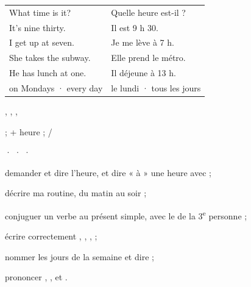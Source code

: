 \begin{essentiel}
\begin{minipage}[t]{0.52\linewidth}
\renewcommand{\arraystretch}{1.32}
\begin{tabular}{@{}>{\enOn\otSemi\fontsize{9.4}{11}\selectfont}l<{\enOff}@{\hspace{3mm}}>{\fontsize{9.2}{11}\selectfont\color{white!78!otNavy}}l@{}}
What time is it?            & Quelle heure est-il ?\\
It's nine thirty.           & Il est 9 h 30.\\
I get up at seven.          & Je me lève à 7 h.\\
She takes the subway.       & Elle prend le métro.\\
He has lunch at one.        & Il déjeune à 13 h.\\
on Mondays · every day      & le lundi · tous les jours\\
\end{tabular}
\end{minipage}\hfill
\begin{minipage}[t]{0.42\linewidth}
{\par}
{\fontsize{9.2}{11.6}\selectfont {}, , , \par}
{\fontsize{9.2}{11.6}\selectfont {} ;  + heure ;  / \par}
{\fontsize{9.2}{11.6}\selectfont {}  ·   ·   ·  \par}
\end{minipage}
\end{essentiel}

\begin{jesais}
\item demander et dire l'heure, et dire « à » une heure avec  ;
\item décrire ma routine, du matin au soir ;
\item conjuguer un verbe au présent simple, avec le  de la 3\textsuperscript{e} personne ;
\item écrire correctement , , ,  ;
\item nommer les jours de la semaine et dire  ;
\item prononcer , ,  et .
\end{jesais}

